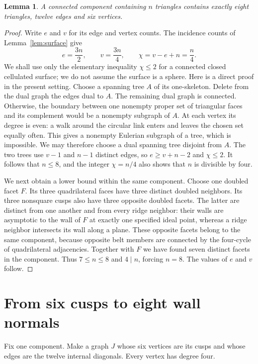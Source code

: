\documentclass[11pt]{article}
\newtheorem{lemma}[theorem]{Lemma}
\theoremstyle{remark}
\begin{document}
\begin{lemma}\label{lem:euler}
A connected component containing $n$ triangles contains exactly
eight triangles, twelve edges and six vertices.
\end{lemma}
\begin{proof}
Write $e$ and $v$ for its edge and vertex counts. The incidence
counts of Lemma~\ref{lem:surface} give
\[
 e=\frac{3n}{2},\qquad v=\frac{3n}{4},\qquad
 \chi=v-e+n=\frac n4.
\]
We shall use only the elementary inequality $\chi\le2$ for a
connected closed cellulated surface; we do not assume the surface
is a sphere. Here is a direct proof in the present setting.
Choose a spanning tree $A$ of its one-skeleton. Delete from the
dual graph the edges dual to $A$. The remaining dual graph is
connected. Otherwise, the boundary between one nonempty proper
set of triangular faces and its complement would be a nonempty
subgraph of $A$. At each vertex its degree is even: a walk around
the circular link enters and leaves the chosen set equally often.
This gives a nonempty Eulerian subgraph of a tree, which is
impossible. We may therefore choose a dual spanning tree disjoint
from $A$. The two trees use $v-1$ and $n-1$ distinct edges, so
$e\ge v+n-2$ and $\chi\le2$. It follows that $n\le8$, and the
integer $\chi=n/4$ also shows that $n$ is divisible by four.

We next obtain a lower bound within the same component. Choose
one doubled facet $F$. Its three quadrilateral faces have three
distinct doubled neighbors. Its three nonsquare cusps also have
three opposite doubled facets. The latter are distinct from one
another and from every ridge neighbor: their walls are asymptotic
to the wall of $F$ at exactly one specified ideal point, whereas
a ridge neighbor intersects its wall along a plane. These opposite
facets belong to the same component, because opposite belt members
are connected by the four-cycle of quadrilateral adjacencies.
Together with $F$ we have found seven distinct facets in the
component. Thus $7\le n\le8$ and $4\mid n$, forcing $n=8$.
The values of $e$ and $v$ follow.
\end{proof}

\section{From six cusps to eight wall normals}

Fix one component. Make a graph $J$ whose six vertices are its
cusps and whose edges are the twelve internal diagonals. Every
vertex has degree four.
\end{document}
